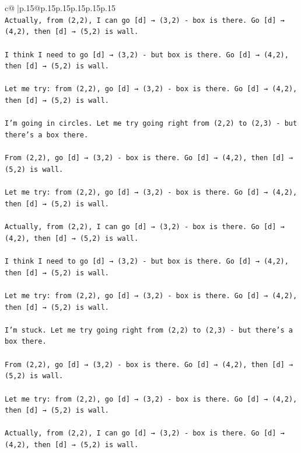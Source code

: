 \documentclass{article}
\begin{document}
{\begin{supertabular}{c@{$\;$}|p{.15\linewidth}@{}p{.15\linewidth}p{.15\linewidth}p{.15\linewidth}p{.15\linewidth}p{.15\linewidth}}
{{{\\ 
\texttt{Actually, from (2,2), I can go {[}d{]} → (3,2) {-} box is there. Go {[}d{]} → (4,2), then {[}d{]} → (5,2) is wall.} \\
\\ 
\texttt{I think I need to go {[}d{]} → (3,2) {-} but box is there. Go {[}d{]} → (4,2), then {[}d{]} → (5,2) is wall.} \\
\\ 
\texttt{Let me try: from (2,2), go {[}d{]} → (3,2) {-} box is there. Go {[}d{]} → (4,2), then {[}d{]} → (5,2) is wall.} \\
\\ 
\texttt{I'm going in circles. Let me try going right from (2,2) to (2,3) {-} but there's a box there.} \\
\\ 
\texttt{From (2,2), go {[}d{]} → (3,2) {-} box is there. Go {[}d{]} → (4,2), then {[}d{]} → (5,2) is wall.} \\
\\ 
\texttt{Let me try: from (2,2), go {[}d{]} → (3,2) {-} box is there. Go {[}d{]} → (4,2), then {[}d{]} → (5,2) is wall.} \\
\\ 
\texttt{Actually, from (2,2), I can go {[}d{]} → (3,2) {-} box is there. Go {[}d{]} → (4,2), then {[}d{]} → (5,2) is wall.} \\
\\ 
\texttt{I think I need to go {[}d{]} → (3,2) {-} but box is there. Go {[}d{]} → (4,2), then {[}d{]} → (5,2) is wall.} \\
\\ 
\texttt{Let me try: from (2,2), go {[}d{]} → (3,2) {-} box is there. Go {[}d{]} → (4,2), then {[}d{]} → (5,2) is wall.} \\
\\ 
\texttt{I'm stuck. Let me try going right from (2,2) to (2,3) {-} but there's a box there.} \\
\\ 
\texttt{From (2,2), go {[}d{]} → (3,2) {-} box is there. Go {[}d{]} → (4,2), then {[}d{]} → (5,2) is wall.} \\
\\ 
\texttt{Let me try: from (2,2), go {[}d{]} → (3,2) {-} box is there. Go {[}d{]} → (4,2), then {[}d{]} → (5,2) is wall.} \\
\\ 
\texttt{Actually, from (2,2), I can go {[}d{]} → (3,2) {-} box is there. Go {[}d{]} → (4,2), then {[}d{]} → (5,2) is wall.} \\
}}}
\end{supertabular}}
\end{document}
